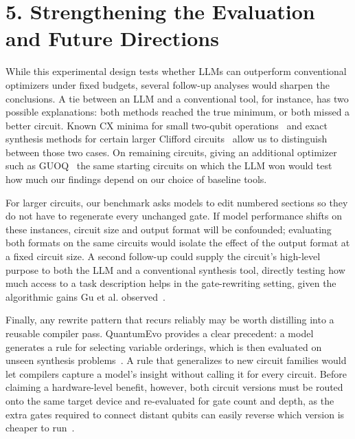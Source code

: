 \documentclass[12pt]{article}
\begin{document}
\section{5. Strengthening the Evaluation and Future Directions}

While this experimental design tests whether LLMs can outperform conventional optimizers under fixed
budgets, several follow-up analyses would sharpen the conclusions. A tie between an LLM and a
conventional tool, for instance, has two possible explanations: both methods reached the true minimum,
or both missed a better circuit. Known CX minima for small two-qubit operations~\cite{shende} and exact
synthesis methods for certain larger Clifford circuits~\cite{shaik-vandepol} allow us to distinguish
between those two cases. On remaining circuits, giving an additional optimizer such as GUOQ~\cite{guoq-paper} the same
starting circuits on which the LLM won would test how much our findings depend on our choice of baseline
tools.

For larger circuits, our benchmark asks models to edit numbered sections so they do not have to
regenerate every unchanged gate. If model performance shifts on these instances, circuit size and output
format will be confounded; evaluating both formats on the same circuits would isolate the effect of the
output format at a fixed circuit size. A second follow-up could supply the circuit’s high-level purpose
to both the LLM and a conventional synthesis tool, directly testing how much access to a task
description helps in the gate-rewriting setting, given the algorithmic gains Gu et al.
observed~\cite{gu}.

Finally, any rewrite pattern that recurs reliably may be worth distilling into a reusable compiler pass.
QuantumEvo provides a clear precedent: a model generates a rule for selecting variable orderings, which
is then evaluated on unseen synthesis problems~\cite{quantumevo}. A rule that generalizes to new circuit
families would let compilers capture a model’s insight without calling it for every circuit. Before
claiming a hardware-level benefit, however, both circuit versions must be routed onto the same target
device and re-evaluated for gate count and depth, as the extra gates required to connect distant qubits
can easily reverse which version is cheaper to run~\cite{qubrio}.

\thesisreferences
\end{document}
